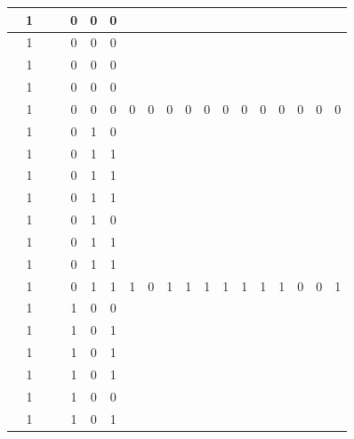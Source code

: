 \begin{table}[!tb]
\begin{tabular}{|c|c|c|c|c|c|c|c|c|c|c|c|c|c|c|c|c|c|c|}
        \rowcolor{yellow!40}  & 1 &  &  & 0 & 0 & 0 &  &  &  &  &  &  &  &  &  &  &  &  \\ \hline
        \rowcolor{yellow!40}  & 1 &  &  & 0 & 0 & 0 &  &  &  &  &  &  &  &  &  &  &  &  \\ \hline
        \rowcolor{yellow!40}  & 1 &  &  & 0 & 0 & 0 &  &  &  &  &  &  &  &  &  &  &  &  \\ \hline
        \rowcolor{yellow!40}  & 1 &  &  & 0 & 0 & 0 &  &  &  &  &  &  &  &  &  &  &  &  \\ \hline
        \rowcolor{yellow!40}  & 1 &  &  & 0 & 0 & 0 & 0 & 0 & 0 & 0 & 0 & 0 & 0 & 0 & 0 & 0 & 0 & 0 \\ \hline
        \rowcolor{gray!40}  & 1 &  &  & 0 & 1 & 0 &  &  &  &  &  &  &  &  &  &  &  &  \\ \hline
        \rowcolor{gray!40}  & 1 &  &  & 0 & 1 & 1 &  &  &  &  &  &  &  &  &  &  &  &  \\ \hline
        \rowcolor{gray!40}  & 1 &  &  & 0 & 1 & 1 &  &  &  &  &  &  &  &  &  &  &  &  \\ \hline
        \rowcolor{gray!40}  & 1 &  &  & 0 & 1 & 1 &  &  &  &  &  &  &  &  &  &  &  &  \\ \hline
        \rowcolor{gray!40}  & 1 &  &  & 0 & 1 & 0 &  &  &  &  &  &  &  &  &  &  &  &  \\ \hline
        \rowcolor{gray!40}  & 1 &  &  & 0 & 1 & 1 &  &  &  &  &  &  &  &  &  &  &  &  \\ \hline
        \rowcolor{gray!40}  & 1 &  &  & 0 & 1 & 1 &  &  &  &  &  &  &  &  &  &  &  &  \\ \hline
        \rowcolor{gray!40}  & 1 &  &  & 0 & 1 & 1 & 1 & 0 & 1 & 1 & 1 & 1 & 1 & 1 & 1 & 0 & 0 & 1 \\ \hline
        \rowcolor{blue!40}  & 1 &  &  & 1 & 0 & 0 &  &  &  &  &  &  &  &  &  &  &  &  \\ \hline
        \rowcolor{blue!40}  & 1 &  &  & 1 & 0 & 1 &  &  &  &  &  &  &  &  &  &  &  &  \\ \hline
        \rowcolor{blue!40}  & 1 &  &  & 1 & 0 & 1 &  &  &  &  &  &  &  &  &  &  &  &  \\ \hline
        \rowcolor{blue!40}  & 1 &  &  & 1 & 0 & 1 &  &  &  &  &  &  &  &  &  &  &  &  \\ \hline
        \rowcolor{blue!40}  & 1 &  &  & 1 & 0 & 0 &  &  &  &  &  &  &  &  &  &  &  &  \\ \hline
        \rowcolor{blue!40}  & 1 &  &  & 1 & 0 & 1 &  &  &  &  &  &  &  &  &  &  &  &  \\ \hline

\end{tabular}
\end{table}
